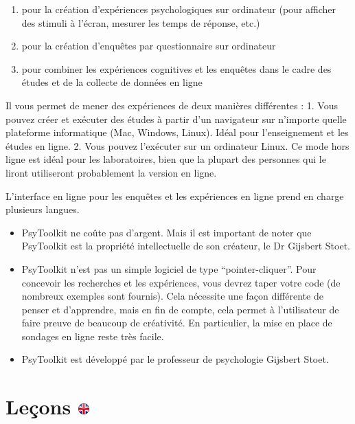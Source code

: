 \documentclass[
]{book}
\providecommand{\tightlist}{%
  \setlength{\itemsep}{0pt}\setlength{\parskip}{0pt}}
\begin{document}
\begin{enumerate}
\def\labelenumi{\arabic{enumi}.}
\tightlist
\item
  pour la création d'expériences psychologiques sur ordinateur (pour
  afficher des stimuli à l'écran, mesurer les temps de réponse, etc.)
\item
  pour la création d'enquêtes par questionnaire sur ordinateur
\item
  pour combiner les expériences cognitives et les enquêtes dans le cadre
  des études et de la collecte de données en ligne
\end{enumerate}

Il vous permet de mener des expériences de deux manières différentes :
1. Vous pouvez créer et exécuter des études à partir d'un navigateur sur
n'importe quelle plateforme informatique (Mac, Windows, Linux). Idéal
pour l'enseignement et les études en ligne. 2. Vous pouvez l'exécuter
sur un ordinateur Linux. Ce mode hors ligne est idéal pour les
laboratoires, bien que la plupart des personnes qui le liront
utiliseront probablement la version en ligne.

L'interface en ligne pour les enquêtes et les expériences en ligne prend
en charge plusieurs langues.

\begin{itemize}
\tightlist
\item
  PsyToolkit ne coûte pas d'argent. Mais il est important de noter que
  PsyToolkit est la propriété intellectuelle de son créateur, le Dr
  Gijsbert Stoet.
\item
  PsyToolkit n'est pas un simple logiciel de type ``pointer-cliquer''.
  Pour concevoir les recherches et les expériences, vous devrez taper
  votre code (de nombreux exemples sont fournis). Cela nécessite une
  façon différente de penser et d'apprendre, mais en fin de compte, cela
  permet à l'utilisateur de faire preuve de beaucoup de créativité. En
  particulier, la mise en place de sondages en ligne reste très facile.
\item
  PsyToolkit est développé par le professeur de psychologie Gijsbert
  Stoet.
\end{itemize}

\hypertarget{leuxe7ons}{%
\section[Leçons ]{\texorpdfstring{Leçons
\href{https://www.psytoolkit.org/\#_lessons}{\protect\includegraphics{img/ukflag.png}}}{Leçons }}\label{leuxe7ons}}
\end{document}
